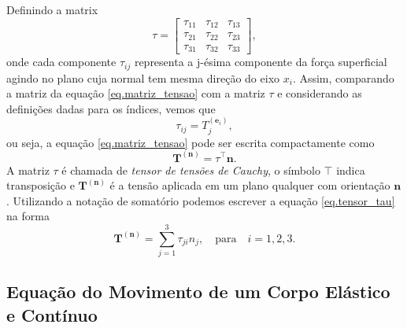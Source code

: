 Definindo a matrix
\begin{equation*}
\tau=
\begin{bmatrix}
\tau_{11}&\tau_{12}&\tau_{13}\\
\tau_{21}&\tau_{22}&\tau_{23}\\
\tau_{31}&\tau_{32}&\tau_{33}
\end{bmatrix},
\end{equation*}
onde cada componente $\tau_{ij}$ representa a j-\'esima componente da for\c{c}a superficial agindo no plano cuja normal tem mesma dire\c{c}\~ao do eixo $x_i$. Assim, comparando a matriz da equa\c{c}\~ao \ref{eq.matriz_tensao} com a matriz $\tau$ e considerando as defini\c{c}\~oes dadas para os \'indices, vemos que
\begin{equation*}
\tau_{ij}=T_j^{(\mathbf{e}_i)},
\end{equation*}
ou seja, a equa\c{c}\~ao \ref{eq.matriz_tensao} pode ser escrita compactamente como
\begin{equation}\label{eq.tensor_tau}
\mathbf{T}^{(\mathbf{n})}=\tau^\top\mathbf{n}.
\end{equation}
A matriz $\tau$ \'e chamada de \textit{tensor de tens\~oes de Cauchy}, o s\'imbolo $\top$ indica transposi\c{c}\~ao e $\mathbf{T}^{(\mathbf{n})}$ \'e a tens\~ao aplicada em um plano qualquer com orienta\c{c}\~ao $\mathbf{n}$. Utilizando a nota\c{c}\~ao de somat\'orio podemos escrever a equa\c{c}\~ao \ref{eq.tensor_tau} na forma
\begin{equation}\label{eq.somatorio_tensor_tau}
\mathbf{T}^{(\mathbf{n})}=\sum_{j=1}^3\tau_{ji}n_j,\quad \text{para}\quad i=1,2,3.
\end{equation}

\subsection{Equa\c{c}\~ao do Movimento de um Corpo El\'astico e Cont\'inuo}

